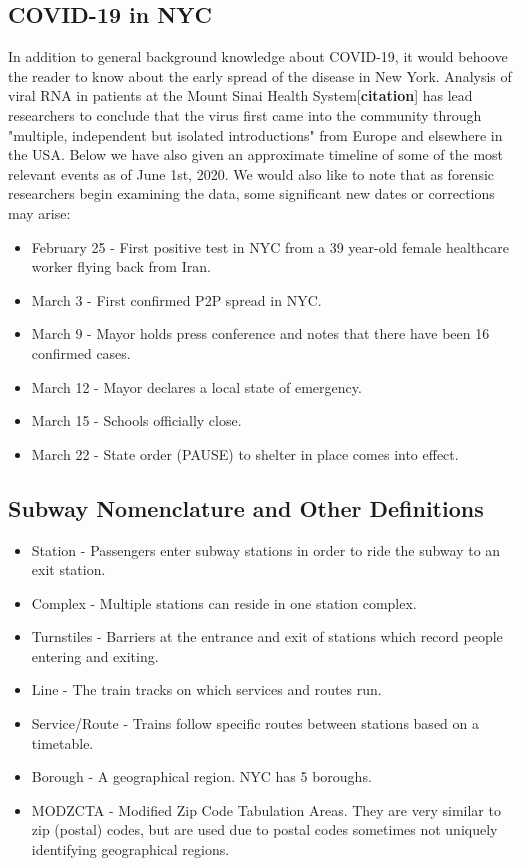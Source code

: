 \documentclass[12pt, a4, epsf] {article}
\theoremstyle{plain}
\theoremstyle{definition}
\begin{document}
\subsection{COVID-19 in NYC}
In addition to general background knowledge about COVID-19, it would behoove the reader to know about the early spread of the disease in New York. Analysis of viral RNA in patients at the Mount Sinai Health System[\textbf{citation}] has lead researchers to conclude that the virus first came into the community through "multiple, independent but isolated introductions" from Europe and elsewhere in the USA. Below we have also given an approximate timeline of some of the most relevant events as of June 1st, 2020. We would also like to note that as forensic researchers begin examining the data, some significant new dates or corrections may arise:\\ 
\begin{itemize}
	\item February 25 - First positive test in NYC from a 39 year-old female healthcare worker flying back from Iran.
	\item March 3 - First confirmed P2P spread in NYC.
	\item March 9 - Mayor holds press conference and notes that there have been 16 confirmed cases.
	\item March 12 - Mayor declares a local state of emergency.
	\item March 15 - Schools officially close.
	\item March 22 - State order (PAUSE) to shelter in place comes into effect.
\end{itemize}
\subsection{Subway Nomenclature and Other Definitions}
\begin{itemize}
    \item {Station} - Passengers enter subway stations in order to ride the subway to an exit station.
    \item {Complex} - Multiple stations can reside in one station complex.
    \item {Turnstiles} - Barriers at the entrance and exit of stations which record people entering and exiting. 
    \item {Line} - The train tracks on which services and routes run.
    \item {Service/Route} - Trains follow specific routes between stations based on a timetable. 
    \item {Borough} - A geographical region. NYC has 5 boroughs. 
    \item {MODZCTA} - Modified Zip Code Tabulation Areas. They are very similar to zip (postal) codes, but are used due to postal codes sometimes not uniquely identifying geographical regions.
\end{itemize}
\end{document}
